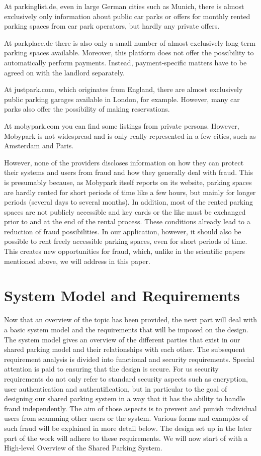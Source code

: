 \documentclass[
a4paper,     %
titlepage,   %
14pt         %
]{scrartcl}  %
\theoremstyle{mystyle}
\begin{document}
At parkinglist.de, even in large German cities such as Munich, there is almost exclusively only information about public car parks or offers for monthly rented parking spaces from car park operators, but hardly any private offers.

At parkplace.de there is also only a small number of almost exclusively long-term parking spaces available. Moreover, this platform does not offer the possibility to automatically perform payments. Instead, payment-specific matters have to be agreed on with the landlord separately.

At justpark.com, which originates from England, there are almost exclusively public parking garages available in London, for example. However, many car parks also offer the possibility of making reservations.

At mobypark.com you can find some listings from private persons. However, Mobypark is not widespread and is only really represented in a few cities, such as Amsterdam and Paris.

However, none of the providers discloses information on how they can protect their systems and users from fraud and how they generally deal with fraud. This is presumably because, as Mobypark itself reports on its website, parking spaces are hardly rented for short periods of time like a few hours, but mainly for longer periods (several days to several months). In addition, most of the rented parking spaces are not publicly accessible and key cards or the like must be exchanged prior to and at the end of the rental process. These conditions already lead to a reduction of fraud possibilities. In our application, however, it should also be possible to rent freely accessible parking spaces, even for short periods of time. This creates new opportunities for fraud, which, unlike in the scientific papers mentioned above, we will address in this paper.

\section{System Model and Requirements}
Now that an overview of the topic has been provided, the next part will deal with a basic system model and the requirements that will be imposed on the design. The system model gives an overview of the different parties that exist in our shared parking model and their relationships with each other. The subsequent requirement analysis is divided into functional and security requirements. Special attention is paid to ensuring that the design is secure. For us security requirements do not only refer to standard security aspects such as encryption, user authentication and authentification, but in particular to the goal of designing our shared parking system in a way that it has the ability to handle fraud independently. The aim of those aspects is to prevent and punish individual users from scamming other users or the system. Various forms and examples of such fraud will be explained in more detail below. The design set up in the later part of the work will adhere to these requirements. We will now start of with a High-level Overview of the Shared Parking System.
\end{document}
